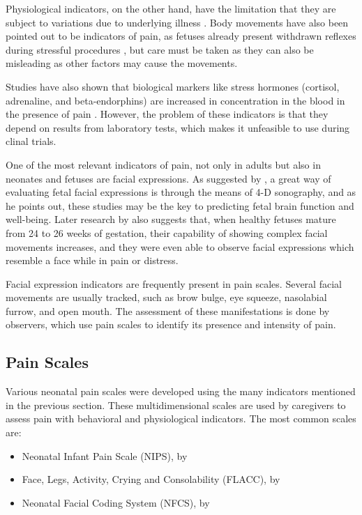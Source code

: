 Physiological indicators, on the other hand, have the limitation that they are subject to variations due to underlying illness \citep{sweet1998physiological}. Body movements have also been pointed out to be indicators of pain, as fetuses already present withdrawn reflexes during stressful procedures \citep{Zimmermann1991}, but care must be taken as they can also be misleading as other factors may cause the movements.

Studies have also shown that biological markers like stress hormones (cortisol, adrenaline, and beta-endorphins) are increased in concentration in the blood in the presence of pain \citep{giannakoulopoulos1994fetal}. However, the problem of these indicators is that they depend on results from laboratory tests, which makes it unfeasible to use during clinal trials.

One of the most relevant indicators of pain, not only in adults but also in neonates and fetuses are facial expressions. As suggested by \cite{Yan2006}, a great way of evaluating fetal facial expressions is through the means of 4-D sonography, and as he points out, these studies may be the key to predicting fetal brain function and well-being. Later research by \cite{Reissland2011, Reissland2013} also suggests that, when healthy fetuses mature from 24 to 26 weeks of gestation, their capability of showing complex facial movements increases, and they were even able to observe facial expressions which resemble a face while in pain or distress.

Facial expression indicators are frequently present in pain scales. Several facial movements are usually tracked, such as brow bulge, eye squeeze, nasolabial furrow, and open mouth. The assessment of these manifestations is done by observers, which use pain scales to identify its presence and intensity of pain.

\subsection{Pain Scales}

Various neonatal pain scales were developed using the many indicators mentioned in the previous section. These multidimensional scales are used by caregivers to assess pain with behavioral and physiological indicators. The most common scales are:

\begin{itemize}
    \item Neonatal Infant Pain Scale (NIPS), by \cite{Lawrence1993}
    \item Face, Legs, Activity, Crying and Consolability (FLACC), by \cite{Merkel1996}
    \item Neonatal Facial Coding System (NFCS), by \cite{Grunau1998}
\end{itemize}

